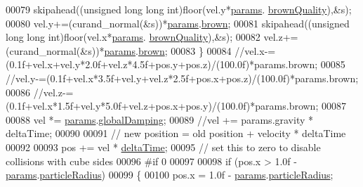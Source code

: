\begin{DoxyCode}
00079                         skipahead((\textcolor{keywordtype}{unsigned} \textcolor{keywordtype}{long} \textcolor{keywordtype}{long} \textcolor{keywordtype}{int})floor(vel.y*\hyperlink{particles__kernel__impl_8cuh_a8db8938e28edd17862daf58651051bdc}{params}.
      \hyperlink{struct_sim_params_a366145dd58e2e7eacebffcbe78dd89ff}{brownQuality}),&s);
00080                         vel.y+=(curand\_normal(&s))*\hyperlink{particles__kernel__impl_8cuh_a8db8938e28edd17862daf58651051bdc}{params}.\hyperlink{struct_sim_params_a88dae34e74c9184adfa9169bad06d0ee}{brown};
00081                         skipahead((\textcolor{keywordtype}{unsigned} \textcolor{keywordtype}{long} \textcolor{keywordtype}{long} \textcolor{keywordtype}{int})floor(vel.x*\hyperlink{particles__kernel__impl_8cuh_a8db8938e28edd17862daf58651051bdc}{params}.
      \hyperlink{struct_sim_params_a366145dd58e2e7eacebffcbe78dd89ff}{brownQuality}),&s);
00082                         vel.z+=(curand\_normal(&s))*\hyperlink{particles__kernel__impl_8cuh_a8db8938e28edd17862daf58651051bdc}{params}.\hyperlink{struct_sim_params_a88dae34e74c9184adfa9169bad06d0ee}{brown};
00083                 \}
00084                 \textcolor{comment}{//vel.x-=(0.1f+vel.x+vel.y*2.0f+vel.z*4.5f+pos.y+pos.z)/(100.0f)*params.brown;}
00085                 \textcolor{comment}{//vel.y-=(0.1f+vel.x*3.5f+vel.y+vel.z*2.5f+pos.x+pos.z)/(100.0f)*params.brown;}
00086                 \textcolor{comment}{//vel.z-=(0.1f+vel.x*1.5f+vel.y*5.0f+vel.z+pos.x+pos.y)/(100.0f)*params.brown;}
00087 
00088         vel *= \hyperlink{particles__kernel__impl_8cuh_a8db8938e28edd17862daf58651051bdc}{params}.\hyperlink{struct_sim_params_a7058bad8c867d9d42d8c9d842638ebea}{globalDamping};
00089                 \textcolor{comment}{//vel += params.gravity * deltaTime;}
00090 
00091         \textcolor{comment}{// new position = old position + velocity * deltaTime}
00092 
00093         pos += vel * \hyperlink{structintegrate__functor_a06dce1826719cd5b2a9fdd9f566da754}{deltaTime};
00095         \textcolor{comment}{// set this to zero to disable collisions with cube sides}
00096 \textcolor{preprocessor}{#if 0}
00097 \textcolor{preprocessor}{}
00098         \textcolor{keywordflow}{if} (pos.x > 1.0f - \hyperlink{particles__kernel__impl_8cuh_a8db8938e28edd17862daf58651051bdc}{params}.\hyperlink{struct_sim_params_a7e131c24e1020c44173deb0f57a8c4af}{particleRadius})
00099         \{
00100             pos.x = 1.0f - \hyperlink{particles__kernel__impl_8cuh_a8db8938e28edd17862daf58651051bdc}{params}.\hyperlink{struct_sim_params_a7e131c24e1020c44173deb0f57a8c4af}{particleRadius};

\end{DoxyCode}
